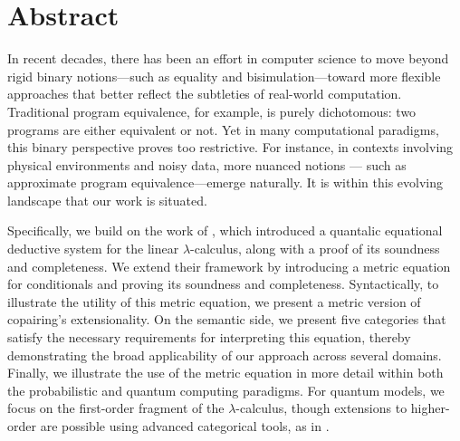 \chapter*{Abstract}

\begin{comment}
Noisy intermediate-scale quantum (NISQ)  computers are expected to operate with severely limited hardware resources. Precisely controlling qubits in these systems comes at a high cost, is susceptible to errors, and faces scarcity challenges. Therefore, error analysis is indispensable for the design, optimization, and assessment of NISQ computing. Nevertheless, the analysis of errors in quantum programs poses a significant challenge. The overarching goal of the M.Sc. project is to provide a fully-fledged
quantum programming language on which to study metric program equivalence
in various scenarios, such as in quantum algorithmics and quantum information theory.
\end{comment}

In recent decades, there has been an effort in computer science to move beyond rigid binary notions—such as equality and bisimulation—toward more flexible approaches that better reflect the  subtleties of real-world computation. Traditional program equivalence, for example, is purely dichotomous: two programs are either equivalent or not. Yet in many computational paradigms, this binary perspective proves too restrictive. For instance, in contexts involving physical environments and noisy data, more nuanced notions --- such as approximate program equivalence---emerge naturally. It is within this evolving landscape that our work is situated. 

Specifically, we build on the work of \cite{dahlqvist2023syntactic}, which introduced a quantalic equational deductive system for the linear $\lambda$-calculus, along with a proof of its soundness and completeness. We extend their framework by introducing a metric equation for conditionals and proving its soundness and completeness.   
Syntactically, to illustrate the utility of this metric equation, we present a metric version of copairing's extensionality. On the semantic side, we present five categories that satisfy the necessary requirements for interpreting this equation, thereby demonstrating the broad applicability of our approach across several domains. Finally, we illustrate the use of the metric equation in more detail within both the probabilistic and quantum computing paradigms. For quantum models, we focus on the first-order fragment of the $\lambda$-calculus, though extensions to higher-order are possible using advanced categorical tools, as in \cite{dahlqvist2023syntactic}. 

